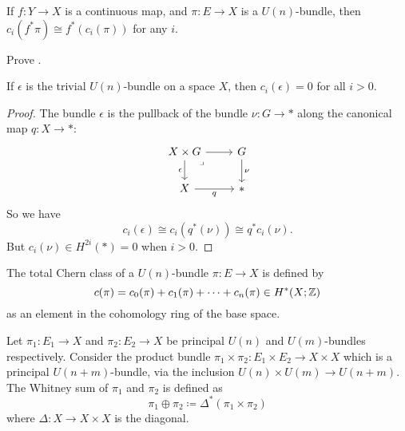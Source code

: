 \documentclass[ma3408.tex]{subfiles}
\begin{document}
\begin{Prop}\label{prop:functoriality-of-chern-classes}
If $f \colon Y \to X$ is a continuous map, and $\pi \colon E \to X$ is a $U(n)$-bundle, then $c_i(f^*\pi) \cong f^*(c_i(\pi))$ for any $i$.
\end{Prop}
\begin{exercise}
Prove . 
\end{exercise}
\begin{Cor}\label{cor:chern-classes-trivial-bundle}
If $\epsilon$ is the trivial $U(n)$-bundle on a space $X$, then $c_i(\epsilon) = 0 $ for all $i > 0$. 
\end{Cor}
\begin{proof}
The bundle $\epsilon$ is the pullback of the bundle $\nu \colon G \to {\ast}$ along the canonical map $q \colon X \to \ast$:
\[\begin{tikzcd}[ampersand replacement=\&]
    {X \times G} \& G \\
    X \& \ast
    \arrow["\nu", from=1-2, to=2-2]
    \arrow["q"', from=2-1, to=2-2]
    \arrow["\epsilon"', from=1-1, to=2-1]
    \arrow[from=1-1, to=1-2]
    \arrow["\lrcorner"{anchor=center, pos=0.125}, draw=none, from=1-1, to=2-2]
\end{tikzcd}\]
 So we have
\[
c_i(\epsilon) \cong c_i(q^*(\nu)) \cong q^*c_i(\nu).
\]
But $c_i(\nu) \in H^{2i}(\ast) = 0$ when $i>0$. 
\end{proof}
\begin{Def}
The total Chern class of a $U(n)$-bundle $\pi \colon E \to X$ is defined by
\[
c(\pi) = c_0(\pi) + c_1(\pi) + \cdots + c_n(\pi) \in H^*(X;\mathbb{Z})
\]
as an element in the cohomology ring of the base space. 
\end{Def}
\begin{Def}
Let $\pi_1 \colon E_1 \to X$ and $\pi_2 \colon E_2 \to X$ be principal $U(n)$ and $U(m)$-bundles respectively. Consider the product bundle $\pi_1 \times \pi_2 \colon E_1 \times E_2 \to X \times X$ which is a principal $U(n+m)$-bundle, via the inclusion $U(n) \times U(m) \to U(n+m)$. The Whitney sum of $\pi_1$ and $\pi_2$ is defined as
\[
\pi_1 \oplus \pi_2 \coloneqq \Delta^*(\pi_1 \times \pi_2)
\]
where $\Delta \colon X \to X \times X$ is the diagonal.
\end{Def}
\end{document}

